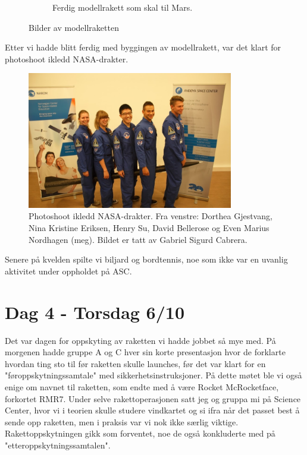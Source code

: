 \documentclass[norsk,a4paper,12pt]{article}
\begin{document}
\begin{figure}[H]
\begin{subfigure}{.5\textwidth}
  \caption{Ferdig modellrakett som skal til Mars.}
  \label{fig:sub2}
\end{subfigure}
\caption{Bilder av modellraketten}
\label{fig:test}
\end{figure}

Etter vi hadde blitt ferdig med byggingen av modellrakett, var det klart for photoshoot ikledd NASA-drakter. 

\begin{figure}[H]
\centering
\includegraphics[width=90mm]{photoshoot.jpg}
\caption{Photoshoot ikledd NASA-drakter. Fra venstre: Dorthea Gjestvang, Nina Kristine Eriksen, Henry Su, David Bellerose og Even Marius Nordhagen (meg). Bildet er tatt av Gabriel Sigurd Cabrera. \label{overflow}}
\end{figure}

Senere p{\aa} kvelden spilte vi biljard og bordtennis, noe som ikke var en uvanlig aktivitet under oppholdet p{\aa} ASC. 

\section*{Dag 4 - Torsdag 6/10}
Det var dagen for oppskyting av raketten vi hadde jobbet s{\aa} mye med. P{\aa} morgenen hadde gruppe A og C hver sin korte presentasjon hvor de forklarte hvordan ting sto til f{\o}r raketten skulle launches, f{\o}r det var klart for en "f{\o}roppskytningssamtale" med sikkerhetsinstruksjoner. P{\aa} dette m{\o}tet ble vi ogs{\aa} enige om navnet til raketten, som endte med {\aa} v{\ae}re Rocket McRocketface, forkortet RMR7. Under selve rakettoperasjonen satt jeg og gruppa mi p{\aa} Science Center, hvor vi i teorien skulle studere vindkartet og si ifra n{\aa}r det passet best {\aa} sende opp raketten, men i praksis var vi nok ikke s{\ae}rlig viktige. Rakettoppskytningen gikk som forventet, noe de ogs{\aa} konkluderte med p{\aa} "etteroppskytningssamtalen". 
\end{document}
